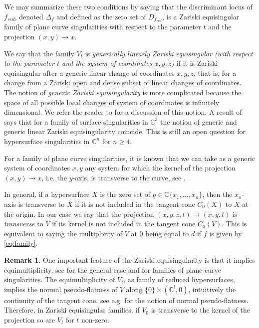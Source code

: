 \documentclass[11pt,a4paper]{amsart}
\newcommand{\1}{{1\!\!1}}
\numberwithin{equation}{section}
\theoremstyle{plain}%
\theoremstyle{definition}
\newtheorem{rmk}[thm]{Remark}
\theoremstyle{definition}
\theoremstyle{remark}
\newcommand{\C}{\mathbb{C}}
\renewcommand{\1}{\mathbf{1}}
\begin{document}
We may summarize these two conditions by saying that the discriminant locus of $f_{red}$, denoted $\Delta_f$ and defined as the zero set of $D_{f_{red}}$,  is a Zariski equisingular family of plane curve singularities with respect to the parameter $t$ and the projection $(x,y) \to x$. 

We say that the family $V_t$ is \emph{generically linearly Zariski equisingular (with respect to the parameter $t$ and the system of coordinates $x,y,z$)} if it is Zariski equisingular after a generic linear change of coordinates $x,y,z$, that is, for a change from a Zariski open and dense subset of linear changes of coordinates.  The notion of \emph{generic Zariski equisingularity} 
is more complicated because the space of all possible local changes of  system of coordinates is infinitely dimensional.  We refer the reader to \cite{PP24} for a discussion of this notion.  A result of \cite{PP24} says that for a family of surface singularities  in $\C^3$ the notion of generic and generic linear Zariski equisingularity coincide.  This is still an open question for hypersurface singularities  in $\C^n$ for $n\ge 4$.  


For a family of plane curve singularities, it is known that we can take as a generic system of coordinates $x,y$ any system for which the kernel of the projection $(x,y)\to x$, i.e. the $y$-axis, is transverse to the curve, see \cite{zariski65-S2}.  

 In general, if a hypersurface $X$ is the zero set of $g\in \C \{x_1, \ldots , x_n\}$, then the $x_n$-axis is transverse to $X$ if it is not included in the tangent cone $C_0(X)$ to $X$ at the origin.  In our case 
we say that the projection $(x,y,z,t) \to  (x,y,t)$ is  \emph{transverse} to $V$
if its kernel is not included in the tangent cone $C_0(V)$. 
This is equivalent to saying the multiplicity of $V$ at $0$ being  equal 
to $d$ if $f$ is given by \eqref{eq:family}.   
 

\begin{rmk}\label{rk:newtransversality and equimultiplicity}
One important feature of the Zariski equisingularity is that it implies equimultiplicity, see \cite{zariski75} 
for the general case and \cite[page 531]{zariski65-S1} for families of plane curve singularities.    
The equimultiplicity of $V_t$, as family of reduced hypersurfaces, 
implies the normal pseudo-flatness of $V$ along $\{0\}\times (\C^l,0)$,  
intuitively the continuity of the tangent cone, see e.g. \cite{Hironaka69}
for the notion of normal pseudo-flatness.  Therefore, in Zariski equisingular families, 
if $V_0$ is transverse to the kernel of the projection so are $V_t$ for $t$ non-zero.
\end{rmk}
\end{document}
